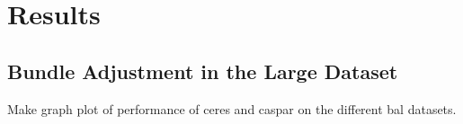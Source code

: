 \section{Results}
\subsection{Bundle Adjustment in the Large Dataset}
Make graph plot of performance of ceres and caspar on the different bal datasets.
